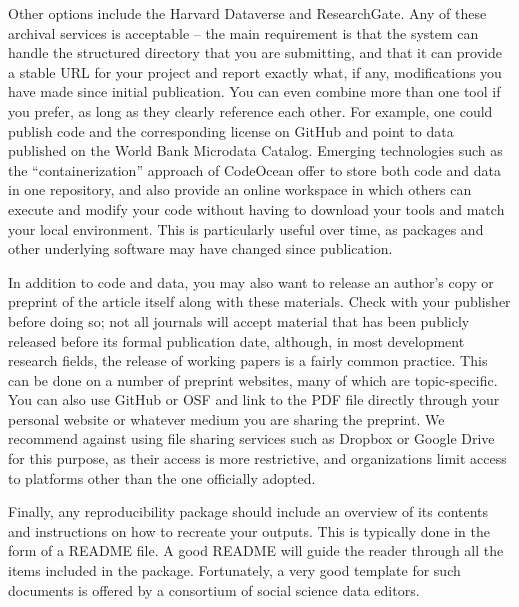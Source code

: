 Other options include the Harvard Dataverse
and ResearchGate.
Any of these archival services is acceptable --
the main requirement is that the system can handle
the structured directory that you are submitting,
and that it can provide a stable URL for your project
and report exactly what, if any,
modifications you have made since initial publication.
You can even combine more than one tool if you prefer,
as long as they clearly reference each other.
For example, one could publish code and the corresponding license on GitHub
and point to data published on the World Bank Microdata Catalog.
Emerging technologies such as the ``containerization'' approach of CodeOcean
offer to store both code and data in one repository,
and also provide an online workspace in which others can execute and modify your code
without having to download your tools and match your local environment.
This is particularly useful over time, as packages and other underlying software may have changed since publication.

In addition to code and data,
you may also want to release an author's copy or preprint
of the article itself along with these materials.
Check with your publisher before doing so;
not all journals will accept material that has been publicly released
before its formal publication date, although,
in most development research fields,
the release of working papers is a fairly common practice.
This can be done on a number of preprint websites,
many of which are topic-specific.
You can also use GitHub or OSF and link to the PDF file directly
through your personal website or whatever medium you are sharing the preprint.
We recommend against using file sharing services such as
Dropbox or Google Drive for this purpose,
as their access is more restrictive,
and organizations limit access to platforms other than the one officially adopted.

Finally, any reproducibility package should include an overview of its contents
and instructions on how to recreate your outputs.
This is typically done in the form of a README file.
A good README will guide the reader through all the items included in the package.
Fortunately, a very good template for such documents is offered by
a consortium of social science data editors.

